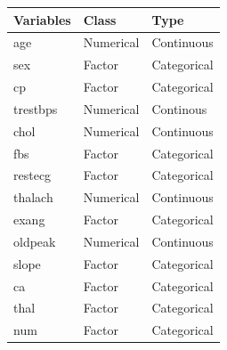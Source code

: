 \documentclass[12pt]{article}
\begin{document}
\begin{center}
\begin{tabular}{|p{2cm}|p{2cm}|p{2cm}|}

\hline
Variables & Class & Type\\
\hline
age & Numerical & Continuous\\
\hline
sex & Factor & Categorical\\
\hline
cp & Factor & Categorical\\
\hline
trestbps & Numerical & Continous\\
\hline
chol & Numerical & Continuous\\
\hline
fbs & Factor & Categorical\\
\hline
restecg & Factor & Categorical\\
\hline
thalach & Numerical & Continuous\\
\hline
exang & Factor & Categorical\\
\hline
oldpeak & Numerical & Continuous\\
\hline
slope & Factor & Categorical\\
\hline
ca & Factor & Categorical\\
\hline
thal & Factor & Categorical\\
\hline
num & Factor & Categorical\\
\hline
\end{tabular}
\end{center}
\end{document}
